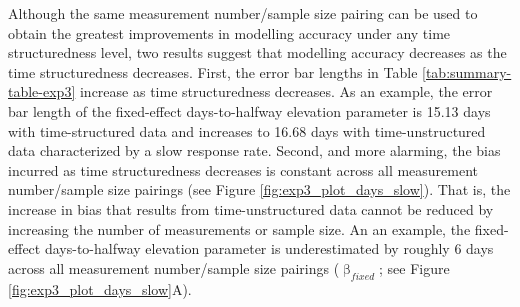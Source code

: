 \documentclass[
12pt, %
twoside,
english]{guelphthesis}
\begin{document}
Although the same measurement number/sample size pairing can be used to obtain the greatest improvements in modelling accuracy under any time structuredness level, two results suggest that modelling accuracy decreases as the time structuredness decreases. First, the error bar lengths in Table \ref{tab:summary-table-exp3} increase as time structuredness decreases. As an example, the error bar length of the fixed-effect days-to-halfway elevation parameter is 15.13 days with time-structured data and increases to 16.68 days with time-unstructured data characterized by a slow response rate. Second, and more alarming, the bias incurred as time structuredness decreases is constant across all measurement number/sample size pairings (see Figure \ref{fig:exp3_plot_days_slow}). That is, the increase in bias that results from time-unstructured data cannot be reduced by increasing the number of measurements or sample size. An an example, the fixed-effect days-to-halfway elevation parameter is underestimated by roughly 6 days across all measurement number/sample size pairings (\(\upbeta_{fixed}\); see Figure \ref{fig:exp3_plot_days_slow}A).
\end{document}
